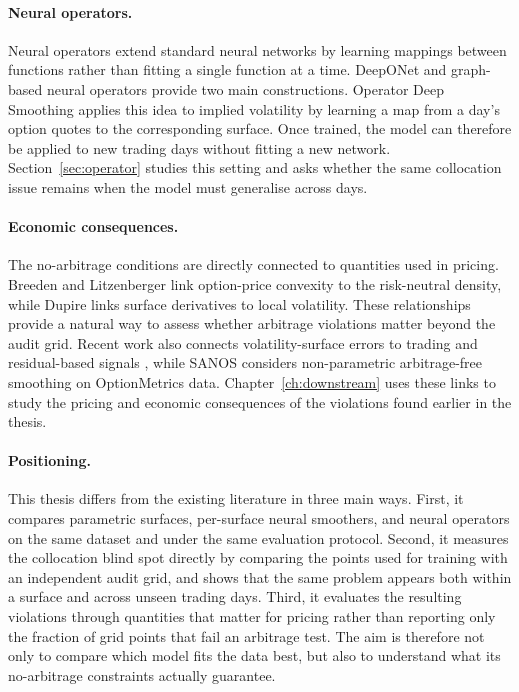 \paragraph{Neural operators.}
Neural operators extend standard neural networks by learning mappings between functions rather than fitting a single function at a time. DeepONet \cite{lu2021} and graph-based neural operators \cite{li2020gno,kovachki2023} provide two main constructions. Operator Deep Smoothing \cite{wiedemann2025} applies this idea to implied volatility by learning a map from a day's option quotes to the corresponding surface. Once trained, the model can therefore be applied to new trading days without fitting a new network. Section~\ref{sec:operator} studies this setting and asks whether the same collocation issue remains when the model must generalise across days.

\paragraph{Economic consequences.}
The no-arbitrage conditions are directly connected to quantities used in pricing. Breeden and Litzenberger \cite{breeden1978} link option-price convexity to the risk-neutral density, while Dupire \cite{dupire1994} links surface derivatives to local volatility. These relationships provide a natural way to assess whether arbitrage violations matter beyond the audit grid. Recent work also connects volatility-surface errors to trading and residual-based signals \cite{duan2026}, while SANOS \cite{sanos2026} considers non-parametric arbitrage-free smoothing on OptionMetrics data. Chapter~\ref{ch:downstream} uses these links to study the pricing and economic consequences of the violations found earlier in the thesis.

\paragraph{Positioning.}
This thesis differs from the existing literature in three main ways. First, it compares parametric surfaces, per-surface neural smoothers, and neural operators on the same dataset and under the same evaluation protocol. Second, it measures the collocation blind spot directly by comparing the points used for training with an independent audit grid, and shows that the same problem appears both within a surface and across unseen trading days. Third, it evaluates the resulting violations through quantities that matter for pricing rather than reporting only the fraction of grid points that fail an arbitrage test. The aim is therefore not only to compare which model fits the data best, but also to understand what its no-arbitrage constraints actually guarantee.


